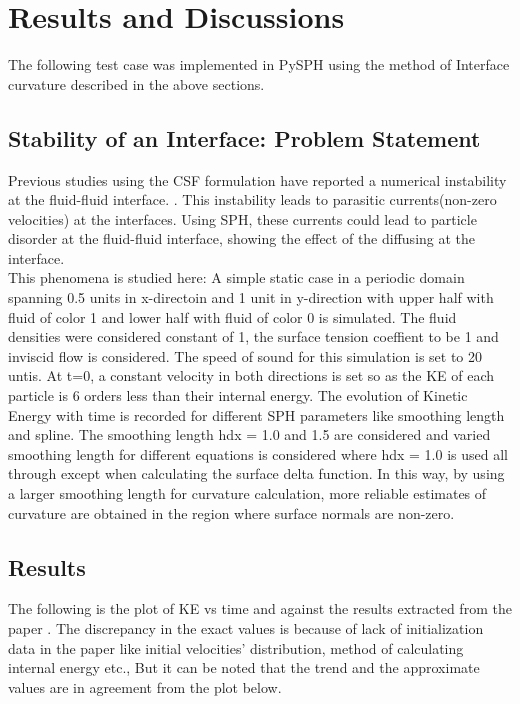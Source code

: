 \chapter{Results and Discussions}
The following test case was implemented in PySPH using the method of Interface curvature described in the above sections. \\


\section{Stability of an Interface: Problem Statement}

Previous studies using the CSF formulation have reported a numerical instability at the fluid-fluid interface. \cite{rudman, Surface}. This instability leads to parasitic currents(non-zero velocities) at the interfaces. Using SPH, these currents could lead to particle disorder at the fluid-fluid interface, showing the effect of the diffusing at the interface. \\

This phenomena is studied here: A simple static case in a periodic domain spanning 0.5 units in x-directoin and 1 unit in y-direction with upper half with fluid of color 1 and lower half with fluid of color 0 is simulated. The fluid densities were considered constant of 1, the surface tension coeffient to be 1 and inviscid flow is considered. The speed of sound for this simulation is set to 20 untis.\cite{Morris} At t=0, a constant velocity in both directions is set so as the KE of each particle is 6 orders less than their internal energy.  The evolution of Kinetic Energy with time is recorded for different SPH parameters like smoothing length and spline. The smoothing length hdx = 1.0 and 1.5 are considered and varied smoothing length for different equations is considered where hdx = 1.0 is used all through except when calculating the surface delta function. In this way, by using a larger smoothing length for curvature calculation, more reliable estimates of curvature are obtained in the region where surface normals are non-zero.

\section{Results}

The following is the plot of KE vs time and against the results extracted from the paper \cite{Morris}. The discrepancy in the exact values is because of lack of initialization data in the paper like initial velocities' distribution, method of calculating internal energy etc., But it can be noted that the trend and the approximate values are in agreement from the plot below.


